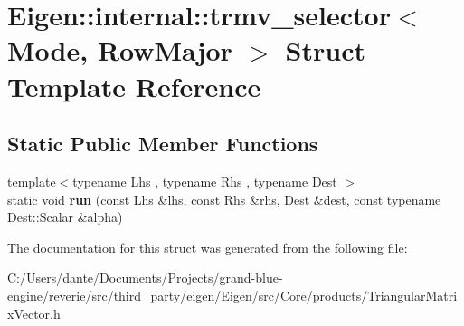 \hypertarget{struct_eigen_1_1internal_1_1trmv__selector_3_01_mode_00_01_row_major_01_4}{}\section{Eigen\+::internal\+::trmv\+\_\+selector$<$ Mode, Row\+Major $>$ Struct Template Reference}
\label{struct_eigen_1_1internal_1_1trmv__selector_3_01_mode_00_01_row_major_01_4}
\subsection*{Static Public Member Functions}
\begin{DoxyCompactItemize}
\item 
\mbox{\label{struct_eigen_1_1internal_1_1trmv__selector_3_01_mode_00_01_row_major_01_4_ac1d7f5899a6fae8d9d41dc1f92a35825}} 
{\footnotesize template$<$typename Lhs , typename Rhs , typename Dest $>$ }\\static void {\bfseries run} (const Lhs \&lhs, const Rhs \&rhs, Dest \&dest, const typename Dest\+::\+Scalar \&alpha)
\end{DoxyCompactItemize}


The documentation for this struct was generated from the following file\+:\begin{DoxyCompactItemize}
\item 
C\+:/\+Users/dante/\+Documents/\+Projects/grand-\/blue-\/engine/reverie/src/third\+\_\+party/eigen/\+Eigen/src/\+Core/products/Triangular\+Matrix\+Vector.\+h\end{DoxyCompactItemize}
